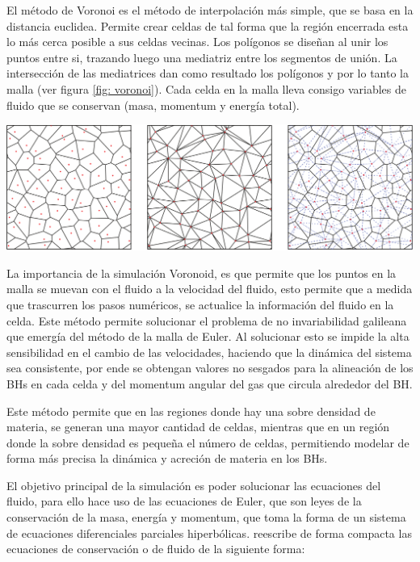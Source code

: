 El método de Voronoi es el método de interpolación más simple, que se basa en la distancia euclidea. Permite crear celdas de tal forma que la región encerrada esta lo más cerca posible a sus celdas vecinas. Los polígonos se diseñan al unir los puntos entre si, trazando luego una mediatriz entre los segmentos de unión. La intersección de las mediatrices dan como resultado los polígonos y por lo tanto la malla (ver figura \ref{fig: voronoi}). Cada celda en la malla lleva consigo variables de fluido que se conservan (masa, momentum y energía total).
%
\begin{center}
\includegraphics[scale=.35]{./figures/5_Algoritmo_Modelacion/voronoi.png}
\label{fig: voronoi}
\end{center}
%
La importancia de la simulación Voronoid, es que permite que los puntos en la malla se muevan con el fluido a la velocidad del fluido, esto permite que a medida que trascurren los pasos numéricos, se actualice la información del fluido en la celda. Este método permite solucionar el problema de no invariabilidad galileana que emergía del método de la malla de Euler. Al solucionar esto se impide la alta sensibilidad en el cambio de las velocidades, haciendo que la dinámica del sistema sea consistente, por ende se obtengan valores no sesgados para la alineación de los BHs en cada celda y del momentum angular del gas que circula alrededor del BH. 

Este método permite que en las regiones donde hay una sobre densidad de materia, se generan una mayor cantidad de celdas, mientras que en un región donde la sobre densidad es pequeña el número de celdas, permitiendo modelar de forma más precisa la dinámica y acreción de materia en los BHs.

El objetivo principal de la simulación es poder solucionar las ecuaciones del fluido, para ello hace uso de las ecuaciones de Euler, que son leyes de la conservación de la masa, energía y momentum, que toma la forma de un sistema de ecuaciones diferenciales parciales hiperbólicas. \cite{springel2010} reescribe de forma compacta las ecuaciones de conservación o de fluido de la siguiente forma:




